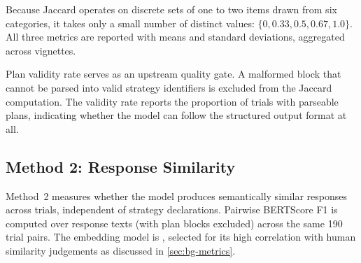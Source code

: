Because Jaccard operates on discrete sets of one to two items drawn from
six categories, it takes only a small number of distinct values:
$\{0, 0.33, 0.5, 0.67, 1.0\}$. All three metrics are reported with means
and standard deviations, aggregated across vignettes.

Plan validity rate serves as an upstream quality gate. A malformed
 block that cannot be parsed into valid strategy identifiers
is excluded from the Jaccard computation. The validity rate reports the
proportion of trials with parseable plans, indicating whether the model can
follow the structured output format at all.


\subsection{Method 2: Response Similarity}
\label{sec:meth-m2}
%

Method~2 measures whether the model produces semantically similar
responses across trials, independent of strategy declarations. Pairwise
BERTScore F1 is computed over response texts (with plan blocks excluded)
across the same 190 trial pairs. The embedding model is
 \parencite{8MQC2H2V}, selected for its
high correlation with human similarity judgements as discussed in
\autoref{sec:bg-metrics}.


